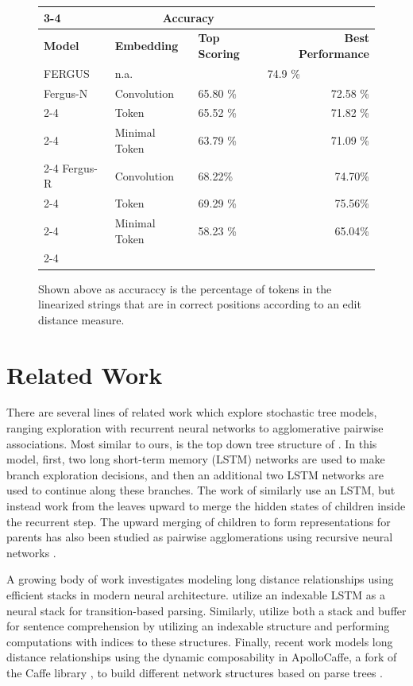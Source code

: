 \documentclass[11pt]{article}
\begin{document}
\begin{figure}
\centering
\begin{tabular}{|l|p{3cm}|p{2.5cm}|r|}
\cline{3-4}
\multicolumn{2}{}{} & \multicolumn{2}{|c|}{Accuracy}   \\ \hline
\textbf{Model} & \textbf{Embedding}  & \textbf{Top Scoring} & \textbf{Best Performance} \\ \hline
FERGUS & n.a. & \multicolumn{2}{|c|}{74.9  \%} \\
\hline \hline
Fergus-N & Convolution & 65.80 \% & 72.58 \% \\ \cline{2-4}
         & Token       & 65.52 \%  & 71.82 \% \\ \cline{2-4}
         & Minimal Token & 63.79 \% & 71.09 \% \\ \cline{2-4}
\hline
Fergus-R & Convolution & 68.22\% & 74.70\% \\ \cline{2-4}
         & Token       &  69.29 \% & 75.56\% \\ \cline{2-4}
         & Minimal Token &  58.23 \% & 65.04\% \\ \cline{2-4}
\hline
\end{tabular}
\label{table:linresults}
\caption{Shown above as accuraccy is the percentage of tokens in the linearized strings that are in correct positions according to an edit distance measure.}
\end{figure}

\section{Related Work}
\label{sec:relatedwork}

There are several lines of related work which explore stochastic tree models, ranging exploration with recurrent neural networks to agglomerative pairwise associations. 
%
Most similar to ours, is the top down tree structure of .
%
In this model, first, two long short-term memory (LSTM) networks are used to make branch exploration decisions, and then an additional two LSTM networks are used to continue along these branches. 
%
The work of  similarly use an LSTM, but instead work from the leaves upward to merge the hidden states of children inside the recurrent step. 
%
The upward merging of children to form representations for parents has also been studied as pairwise agglomerations using recursive neural networks \cite{Socher2010}.

A growing body of work investigates modeling long distance relationships using efficient stacks in modern neural architecture. 
%
 utilize an indexable LSTM as a neural stack for transition-based parsing.  
%
Similarly,  utilize both a stack and buffer for sentence comprehension by utilizing an indexable structure and performing computations with indices to these structures. 
%
Finally, recent work models long distance relationships using the dynamic composability in ApolloCaffe, a fork of the Caffe library \cite{jia2014caffe}, to build different network structures based on parse trees \cite{Andreas2016LearningTC}.
\end{document}
